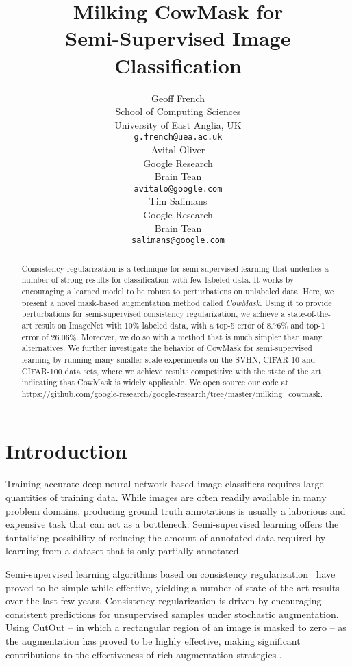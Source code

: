 \documentclass{article}
\title{Milking CowMask for\\ 
Semi-Supervised Image Classification}
\author{
  Geoff French\\
  School of Computing Sciences \\
  University of East Anglia, UK \\
  \texttt{g.french@uea.ac.uk} \\
  \And
  Avital Oliver \\
  Google Research \\
  Brain Tean \\
  \texttt{avitalo@google.com} \\
  \And
  Tim Salimans \\
  Google Research \\
  Brain Tean \\
  \texttt{salimans@google.com}
}
\begin{document}
\maketitle

\begin{abstract}
Consistency regularization is a technique for semi-supervised learning that underlies a number of strong results for classification with few labeled data. It works by encouraging a learned model to be robust to perturbations on unlabeled data. Here, we present a novel mask-based augmentation method called \emph{CowMask}. Using it to provide perturbations for semi-supervised consistency regularization, we achieve a state-of-the-art result on ImageNet with 10\% labeled data, with a top-5 error of 8.76\% and top-1 error of 26.06\%. Moreover, we do so with a method that is much simpler than many alternatives. We further investigate the behavior of CowMask for semi-supervised learning by running many smaller scale experiments on the SVHN, CIFAR-10 and CIFAR-100 data sets, where we achieve results competitive with the state of the art, indicating that CowMask is widely applicable. We open source our code at
\url{https://github.com/google-research/google-research/tree/master/milking_cowmask}.
\end{abstract}






\section{Introduction}
\label{sec:introduction}

Training accurate deep neural network based image classifiers requires large quantities of
training data. While images are often readily available in many problem domains, producing
ground truth annotations is usually a laborious and expensive task that can act as a
bottleneck. Semi-supervised learning offers the tantalising possibility of reducing the
amount of annotated data required by learning from a dataset that is only partially
annotated.

Semi-supervised learning algorithms based on consistency
regularization~\cite{Sajjadi:Mutual, Laine:Temporal, Oliver:RealisticEval} have proved to be simple while effective,
yielding a number of state of the art results over the last few years.
Consistency regularization is driven by encouraging consistent predictions for unsupervised
samples under stochastic augmentation.
Using CutOut \cite{Devries:Cutout} -- in which a rectangular region of an image
is masked to zero -- as the augmentation
has proved to be highly effective, making significant
contributions to the effectiveness of rich augmentation strategies \cite{Xie:UDA, Sohn:FixMatch}.
\end{document}
